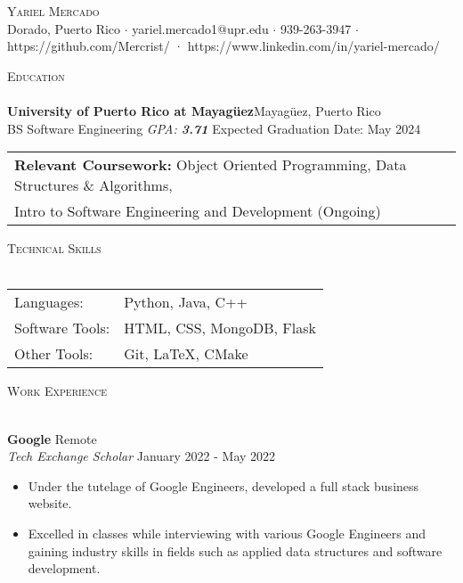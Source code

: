 \documentclass[a4paper]{article}
\newcommand{\lineunder} {
    \vspace*{-8pt} \\
    \hspace*{-18pt} \hrulefill \\
}
\newcommand{\header} [1] {
    {\hspace*{-18pt}\vspace*{6pt} \textsc{#1}}
    \vspace*{-6pt} \lineunder
}
\begin{document}
\vspace*{-40pt}

    

\vspace*{-10pt}
\begin{center}
	{\Huge \scshape {Yariel Mercado}}\\
	Dorado, Puerto Rico $\cdot$ yariel.mercado1@upr.edu $\cdot$ 939-263-3947 $\cdot$ https://github.com/Mercrist/ · https://www.linkedin.com/in/yariel-mercado/\\
\end{center}

\header{Education}
\textbf{University of Puerto Rico at Mayagüez}\hfill Mayagüez, Puerto Rico\\
BS Software Engineering \textit{GPA: \bf{3.71}} \hfill Expected Graduation Date: May 2024\\

\vspace{2mm}
\begin{tabular}{ l l }
	\textbf{Relevant Coursework:} Object Oriented 	                    				Programming, Data Structures \& Algorithms, \\ Intro to Software Engineering and Development (Ongoing) 
\vspace{2mm}
\end{tabular}

\header{Technical Skills}
\begin{tabular}{ l l }
	Languages:       & Python, Java, C++                \\
	Software Tools: & HTML, CSS, MongoDB, Flask \\
	Other Tools:   & Git, LaTeX, CMake  \\
	
\end{tabular}
\vspace{2mm}

\header{Work Experience}
\vspace{-1mm}

\textbf{Google} \hfill Remote\\
\textit{Tech Exchange Scholar} \hfill January 2022 - May 2022\\
\vspace{-2mm}
\begin{itemize} \itemsep -1pt
	\item Under the tutelage of Google Engineers, developed a full stack business website.
	\item Excelled in classes while interviewing with various Google Engineers and gaining industry skills in fields such as applied data structures and software development.
\end{itemize}
\end{document}
